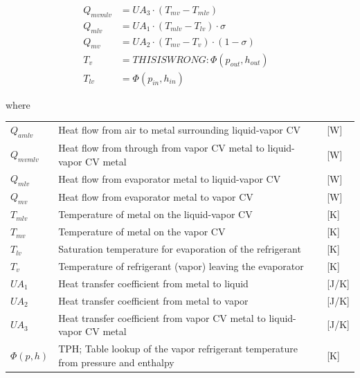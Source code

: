 \begin{align}
	Q_{mvmlv} & = U A_3 \cdot (T_{mv} - T_{mlv}) \label{eq:Q_mvml}             &  \\
	Q_{mlv}   & = U A_1 \cdot (T_{mlv} - T_{lv}) \cdot \sigma	\label{eq:Q_ml}&  \\
	Q_{mv}    & = U A_2 \cdot (T_{mv} - T_v) \cdot (1- \sigma) \label{eq:Q_mv} &  \\
	T_v       & = THIS IS WRONG: \Phi(p_{out}, h_{out}) \label{eq:T_v}                        &  \\
	T_{lv}    & = \Phi(p_{in}, h_{in}) \label{eq:T_v}                          &
\end{align}

where

\begin{center}
	\begin{tabular}{l p{10cm} l}
		$Q_{amlv}$  & Heat flow from air to metal surrounding liquid-vapor CV                           & [\si{W}]        \\
		$Q_{mvmlv}$ & Heat flow from through from vapor CV metal to liquid-vapor CV metal               & [\si{W}]        \\
		$Q_{mlv}$   & Heat flow from evaporator metal to liquid-vapor CV                                & [\si{W}]        \\
		$Q_{mv}$    & Heat flow from evaporator metal to vapor CV                                       & [\si{W}]        \\
		$T_{mlv}$   & Temperature of metal on the liquid-vapor CV                                       & [\si{K}]        \\
		$T_{mv}$    & Temperature of metal on the vapor CV                                              & [\si{K}]        \\
		$T_{lv}$    & Saturation temperature for evaporation of the refrigerant                         & [\si{K}]        \\
		$T_{v}$     & Temperature of refrigerant (vapor) leaving the evaporator                         & [\si{K}]        \\
		$UA_1$      & Heat transfer coefficient from metal to liquid                                    & [\si{J}/\si{K}] \\
		$UA_2$      & Heat transfer coefficient from metal to vapor                                     & [\si{J}/\si{K}] \\
		$UA_3$      & Heat transfer coefficient from vapor CV metal to liquid-vapor CV metal            & [\si{J}/\si{K}] \\
		$\Phi(p,h)$ & TPH; Table lookup of the vapor refrigerant temperature from pressure and enthalpy & [\si{K}]
	\end{tabular}
\end{center}


